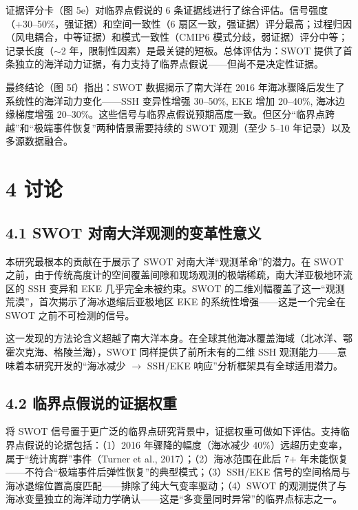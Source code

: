 \documentclass[11pt,a4paper]{article}
\begin{document}
证据评分卡（图 5e）对临界点假说的 6 条证据线进行了综合评估。信号强度（+30--50\%，强证据）和空间一致性（6 扇区一致，强证据）评分最高；过程归因（风电耦合，中等证据）和模式一致性（CMIP6 模式分歧，弱证据）评分中等；记录长度（$\sim$2 年，限制性因素）是最关键的短板。总体评估为：SWOT 提供了首条独立的海洋动力证据，有力支持了临界点假说——但尚不是决定性证据。\par

最终结论（图 5f）指出：SWOT 数据揭示了南大洋在 2016 年海冰骤降后发生了系统性的海洋动力变化——SSH 变异性增强 30--50\%, EKE 增加 20--40\%, 海冰边缘梯度增强 20--30\%。这些信号与临界点假说预期高度一致。但区分``临界点跨越''和``极端事件恢复''两种情景需要持续的 SWOT 观测（至少 5--10 年记录）以及多源数据融合。\par

\section*{4  讨论}

\subsection*{4.1  SWOT 对南大洋观测的变革性意义}

本研究最根本的贡献在于展示了 SWOT 对南大洋``观测革命''的潜力。在 SWOT 之前，由于传统高度计的空间覆盖间隙和现场观测的极端稀疏，南大洋亚极地环流区的 SSH 变异和 EKE 几乎完全未被约束。SWOT 的二维刈幅覆盖了这一``观测荒漠''，首次揭示了海冰退缩后亚极地区 EKE 的系统性增强——这是一个完全在 SWOT 之前不可检测的信号。\par

这一发现的方法论含义超越了南大洋本身。在全球其他海冰覆盖海域（北冰洋、鄂霍次克海、格陵兰海），SWOT 同样提供了前所未有的二维 SSH 观测能力——意味着本研究开发的``海冰减少 $\to$ SSH/EKE 响应''分析框架具有全球适用潜力。\par

\subsection*{4.2  临界点假说的证据权重}

将 SWOT 信号置于更广泛的临界点研究背景中，证据权重可做如下评估。支持临界点假说的论据包括：（1）2016 年骤降的幅度（海冰减少 40\%）远超历史变率，属于``统计离群''事件（Turner et al., 2017）；（2）海冰范围在此后 7+ 年未能恢复——不符合``极端事件后弹性恢复''的典型模式；（3）SSH/EKE 信号的空间格局与海冰退缩位置高度匹配——排除了纯大气变率驱动；（4）SWOT 的观测提供了与海冰变量独立的海洋动力学确认——这是``多变量同时异常''的临界点标志之一。\par
\end{document}
